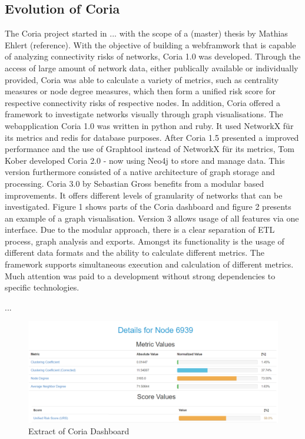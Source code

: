 \documentclass[conference]{IEEEtran}
\begin{document}
\subsection{Evolution of Coria}
The Coria project started in ... with the scope of a (master) thesis by Mathias Ehlert (reference). With the objective of building a webframwork that is capable of analyzing connectivity risks of networks, Coria 1.0 was developed. Through the access of large amount of network data, either publically available or individually provided, Coria was able to calculate a variety of metrics, such as  
centrality measures or node degree measures, which then form a unified risk score for respective connectivity risks of respective nodes. In addition, Coria offered a framework to investigate networks visually through graph visualisations. 
 The webapplication Coria 1.0 was written in python and ruby. It used NetworkX für its metrics and redis for database purposes. After Coria 1.5 presented a improved performance and the use of Graphtool instead of NetworkX für its metrics, Tom Kober developed Coria 2.0 - now using Neo4j to store and manage data. This version furthermore consisted of a native architecture of graph storage and processing. Coria 3.0 by Sebastian Gross benefits from a modular based improvements. It offers different levels of granularity of networks that can be investigated. Figure 1 shows parts of the Coria dashboard and figure 2 presents an example of a graph visualisation. Version 3 allows usage of all features via one interface. Due to the modular approach, there is a clear separation of ETL process, graph analysis and exports. Amongst its functionality is the usage of different data formats and the ability to calculate different metrics. The framework supports simultaneous execution and calculation of different metrics. Much attention was paid to a development without strong dependencies to specific technologies.
   
... \\ 

 





\begin{figure}[htbp]
\centerline{\includegraphics[scale=0.4]{Graphics/coriaExtract.PNG}}
\caption{Extract of Coria Dashboard}
\label{fig}
\end{figure}
\end{document}
